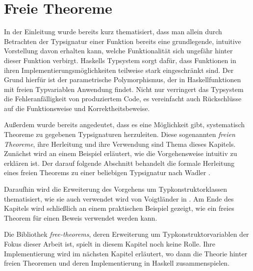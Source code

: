 \section{Freie Theoreme}

\label{sec:freie-theoreme}

In der Einleitung wurde bereits kurz thematisiert, dass man allein durch Betrachten der Typsignatur einer Funktion bereits
eine grundlegende, intuitive Vorstellung davon erhalten kann, welche Funktionalität sich ungefähr hinter dieser Funktion
verbirgt. Haskells Typsystem sorgt dafür, dass Funktionen in ihren Implementierungsmöglichkeiten
teilweise stark eingeschränkt sind. Der Grund hierfür ist der parametrische Polymorphismus, der in Haskellfunktionen
mit freien Typvariablen Anwendung findet. Nicht nur verringert das Typsystem die Fehleranfälligkeit von produziertem
Code, es vereinfacht auch Rückschlüsse auf die Funktionsweise und Korrektheitsbeweise.

Außerdem wurde bereits angedeutet, dass es eine Möglichkeit gibt, systematisch Theoreme zu gegebenen Typsignaturen
herzuleiten. Diese sogenannten \textit{freien Theoreme}, ihre Herleitung und ihre Verwendung sind Thema dieses Kapitels.
Zunächst wird an einem Beispiel
erläutert, wie die Vorgehensweise intuitiv zu erklären ist. Der darauf folgende Abschnitt behandelt die formale Herleitung
eines freien Theorems zu einer beliebigen Typsignatur nach Wadler \cite{wadler}.

Daraufhin wird die Erweiterung des Vorgehens um Typkonstruktorklassen thematisiert, wie sie
auch verwendet wird von Voigtländer in \cite{voigtlander}. Am Ende des Kapitels wird schließlich an einem
praktischen Beispiel gezeigt, wie ein freies Theorem für einen Beweis verwendet werden kann.

Die Bibliothek \textit{free-theorems}, deren Erweiterung um Typkonstruktorvariablen der Fokus dieser Arbeit ist, spielt
in diesem Kapitel noch keine Rolle. Ihre Implementierung wird im nächsten Kapitel erläutert, wo dann die Theorie hinter
freien Theoremen und deren Implementierung in Haskell zusammenspielen.


